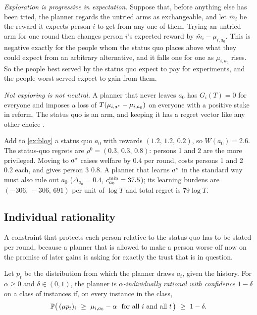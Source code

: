 \emph{Exploration is progressive in expectation.} Suppose that, before anything else has been tried, the planner regards the untried arms as exchangeable, and let $\bar m_i$ be the reward it expects person $i$ to get from any one of them. Trying an untried arm for one round then changes person $i$'s expected reward by $\bar m_i-\mu_{i,a_0}$. This is negative exactly for the people whom the status quo places above what they could expect from an arbitrary alternative, and it falls one for one as $\mu_{i,a_0}$ rises. So the people best served by the status quo expect to pay for experiments, and the people worst served expect to gain from them.

\emph{Not exploring is not neutral.} A planner that never leaves $a_0$ has $G_i(T)=0$ for everyone and imposes a loss of $T(\mu_{i,a^\star}-\mu_{i,a_0})$ on everyone with a positive stake in reform. The status quo is an arm, and keeping it has a regret vector like any other choice \citep{meyer2015}.

\begin{example}\label{ex:sq}
Add to \cref{ex:blog} a status quo $a_0$ with rewards $(1.2,\,1.2,\,0.2)$, so $W(a_0)=2.6$. The status-quo regrets are $\rho^0=(0.3,\,0.3,\,0.8)$: persons 1 and 2 are the more privileged. Moving to $a^\star$ raises welfare by $0.4$ per round, costs persons 1 and 2 $0.2$ each, and gives person 3 $0.8$. A planner that learns $a^\star$ in the standard way must also rule out $a_0$ ($\Delta_{a_0}=0.4$, $c^{\min}_{a_0}=37.5$); its learning burdens are $(-306,\,-306,\,691)$ per unit of $\log T$ and total regret is $79\log T$.
\end{example}

\subsection{Individual rationality}

A constraint that protects each person relative to the status quo has to be stated per round, because a planner that is allowed to make a person worse off now on the promise of later gains is asking for exactly the trust that is in question.

\begin{definition}\label{def:ir}
Let $p_t$ be the distribution from which the planner draws $a_t$, given the history. For $\alpha\ge0$ and $\delta\in(0,1)$, the planner is \emph{$\alpha$-individually rational with confidence $1-\delta$} on a class of instances if, on every instance in the class,
\[
  \Prob\big(\,(\mu p_t)_i\ \ge\ \mu_{i,a_0}-\alpha\ \text{ for all } i \text{ and all } t\,\big)\ \ge\ 1-\delta .
\]
\end{definition}

